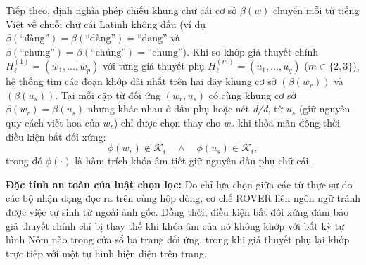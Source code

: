Tiếp theo, định nghĩa phép chiếu khung chữ cái cơ sở $\beta(w)$ chuyển mỗi từ tiếng Việt về chuỗi chữ cái Latinh không dấu (ví dụ $\beta(\text{``đàng''}) = \beta(\text{``dàng''}) = \text{``dang''}$ và $\beta(\text{``chưng''}) = \beta(\text{``chúng''}) = \text{``chung''}$). Khi so khớp giả thuyết chính $H^{(1)}_\ell = (w_1, \dots, w_p)$ với từng giả thuyết phụ $H^{(m)}_\ell = (u_1, \dots, u_q)$ ($m \in \{2, 3\}$), hệ thống tìm các đoạn khớp dài nhất trên hai dãy khung cơ sở $(\beta(w_r))$ và $(\beta(u_s))$. Tại mỗi cặp từ đối ứng $(w_r, u_s)$ có cùng khung cơ sở $\beta(w_r) = \beta(u_s)$ nhưng khác nhau ở dấu phụ hoặc nét \textit{d/đ}, từ $u_s$ (giữ nguyên quy cách viết hoa của $w_r$) chỉ được chọn thay cho $w_r$ khi thỏa mãn đồng thời điều kiện bất đối xứng:
\begin{equation}
    \phi(w_r) \notin \mathcal{K}_i \quad \land \quad \phi(u_s) \in \mathcal{K}_i,
\end{equation}
trong đó $\phi(\cdot)$ là hàm trích khóa âm tiết giữ nguyên dấu phụ chữ cái.

\begin{softbox}
\textbf{Đặc tính an toàn của luật chọn lọc:} Do chỉ lựa chọn giữa các từ thực sự do các bộ nhận dạng đọc ra trên cùng hộp dòng, cơ chế ROVER liên ngôn ngữ tránh được việc tự sinh từ ngoài ảnh gốc. Đồng thời, điều kiện bất đối xứng đảm bảo giả thuyết chính chỉ bị thay thế khi khóa âm của nó không khớp với bất kỳ tự hình Nôm nào trong cửa sổ ba trang đối ứng, trong khi giả thuyết phụ lại khớp trực tiếp với một tự hình hiện diện trên trang.
\end{softbox}

